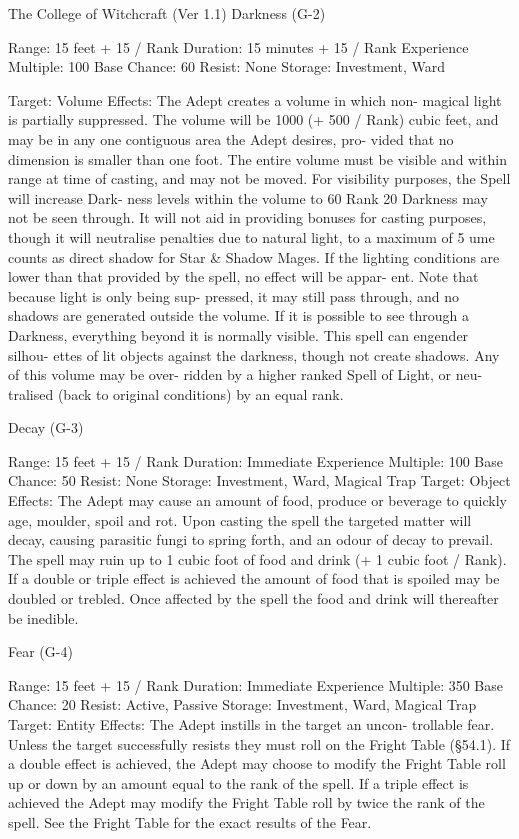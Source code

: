 \begin{Chapter}{The College of Witchcraft (Ver 1.1)}
Darkness (G-2) 

Range: 15 feet + 15 / Rank 
Duration: 15 minutes + 15 / Rank 
Experience Multiple: 100 
Base Chance: 60%
Resist: None 
Storage: Investment, Ward 

Target: Volume 
Effects: The Adept creates a volume in which non-
magical  light  is  partially  suppressed.  The  volume 
will be 1000 (+ 500 / Rank) cubic feet, and may be 
in any one contiguous area the Adept desires, pro-
vided  that  no  dimension  is  smaller  than  one  foot. 
The entire volume must be visible and within range 
at  time  of  casting,  and  may  not  be  moved.  For 
visibility  purposes,  the  Spell  will  increase  Dark-
ness levels within the volume to 60%
Rank 20 Darkness may not be seen through. It will 
not  aid  in  providing  bonuses  for  casting  purposes, 
though  it  will  neutralise  penalties  due  to  natural 
light, to a maximum of 5%
ume  counts  as  direct  shadow  for  Star  \&  Shadow 
Mages.  If  the  lighting  conditions  are  lower  than 
that provided by the spell, no effect  will be appar-
ent.  Note  that  because  light  is  only  being  sup-
pressed, it may still pass through, and no shadows 
are generated outside the volume. If it is possible to 
see  through  a  Darkness,  everything  beyond  it  is 
normally  visible.  This  spell  can  engender  silhou-
ettes of lit objects against the darkness, though not 
create  shadows.  Any  of  this  volume  may  be  over-
ridden  by  a  higher  ranked  Spell  of  Light,  or  neu-
tralised  (back  to  original  conditions)  by  an  equal 
rank. 

Decay (G-3) 

Range: 15 feet + 15 / Rank 
Duration: Immediate 
Experience Multiple: 100 
Base Chance: 50%
Resist: None 
Storage: Investment, Ward, Magical Trap 
Target: Object 
Effects:  The  Adept  may  cause  an  amount  of  food, 
produce or beverage to quickly age, moulder, spoil 
and  rot.  Upon casting  the  spell  the  targeted  matter 
will  decay,  causing  parasitic  fungi  to  spring  forth, 
and  an  odour  of  decay  to  prevail.  The  spell  may 
ruin up to 1 cubic foot of food and drink (+ 1 cubic 
foot / Rank). If a double or triple effect is achieved 
the amount of food that is spoiled may be doubled 
or trebled. Once affected by the spell the food and 
drink will thereafter be inedible. 

Fear (G-4) 

Range: 15 feet + 15 / Rank 
Duration: Immediate 
Experience Multiple: 350 
Base Chance: 20%
Resist: Active, Passive 
Storage: Investment, Ward, Magical Trap 
Target: Entity 
Effects:  The  Adept  instills  in  the  target  an  uncon-
trollable fear. Unless the target successfully resists 
they  must  roll  on  the  Fright  Table  (§54.1).  If  a 
double effect is achieved, the Adept may choose to 
modify  the  Fright  Table  roll  up  or  down  by  an 
amount  equal  to  the  rank  of  the  spell.  If  a  triple 
effect is achieved the Adept may modify the Fright 
Table  roll  by  twice  the  rank  of  the  spell.  See  the 
Fright Table for the exact results of the Fear. 


\end{Chapter}
